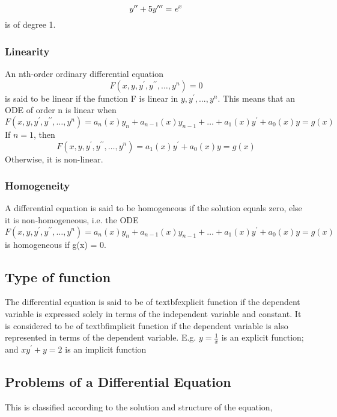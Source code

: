 \documentclass[12pt]{report}
\begin{document}
\begin{equation}
y^{\prime\prime} + 5y^{\prime\prime\prime} = \textit e^x  
\end{equation}
is of degree 1.
	
\subsubsection{Linearity} 
An nth-order ordinary differential equation 
\begin{equation}
F(x,y,y^\prime,y^{\prime\prime},\dots,y^n ) = 0
\end{equation} is said to be linear if the function F is linear in $y, y^\prime, ... , y^n$. This means that an ODE of order n is linear when
\begin{equation}
F(x,y,y^\prime,y^{\prime\prime},\dots,y^n ) = a_n(x)y_n + a_{n-1}(x)y_{n-1} + \dots + a_1(x)y^\prime + a_0(x)y = g(x)  
\end{equation}
If $n = 1$, then
\begin{equation}
F(x,y,y^\prime,y^{\prime\prime},\dots,y^n ) = a_1(x)y^\prime + a_0(x)y = g(x)
\end{equation} Otherwise, it is non-linear.
\subsubsection{Homogeneity}
A differential equation is said to be homogeneous if the solution equals zero, else it is non-homogeneous, i.e. the ODE \medskip
\begin{equation}
F(x,y,y^\prime,y^{\prime\prime},\dots,y^n ) = a_n(x)y_n + a_{n-1}(x)y_{n-1} + \dots + a_1(x)y^\prime + a_0(x)y = g(x) 
\end{equation}
is homogeneous if g(x) = 0.
	
\subsection{Type of function}
The differential equation is said to be of textbfexplicit function if the dependent variable is expressed solely in terms of the independent variable and constant. It is considered to be of textbfimplicit function if the dependent variable is also represented in terms of the dependent variable. E.g.
$y = \frac{1}{x}$  is an explicit function; and $xy^\prime + y = 2$  is an implicit function
	
\subsection{Problems of a Differential Equation}\label{sec: Problems of ODE}
This is classified according to the solution and structure of the equation,
\end{document}

